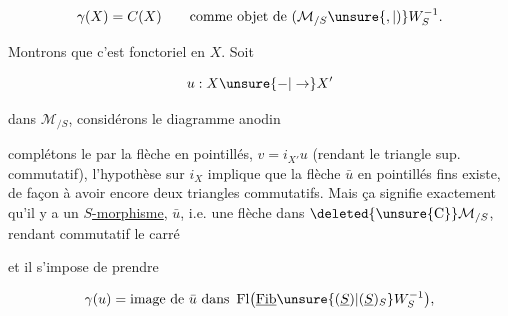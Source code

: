 \[
\gamma(X)=C(X)\qquad\text{comme objet de }(\mathcal M_{/S}\unsure{,|)}W_S^{-1}.
\]

Montrons que c'est fonctoriel en $X$. Soit

\[
u:X\unsure{-|\to}X'
\]

dans $\mathcal M_{/S}$, considérons le diagramme anodin 



complétons le par la flèche en  pointillés, $v=i_{X'}u$ (rendant le triangle sup. commutatif), l'hypothèse sur $i_X$ implique que la flèche $\bar u$ en pointillés fins existe, de façon à avoir encore deux triangles commutatifs. Mais ça signifie exactement qu'il y a un \uline{$S$-morphisme}, $\bar u$, i.e. une flèche dans $\deleted{\unsure{\mathrm C}}\mathcal M_{/S}$, rendant commutatif le carré


et il s'impose de prendre

\[
\gamma(u)=\text{image de }\bar u\text{ dans }\operatorname{Fl}\bigl(\underline{\mathrm{Fib}}\unsure{(\underline S)|(\underline S)_{S}}W_S^{-1}\bigr),
\]

